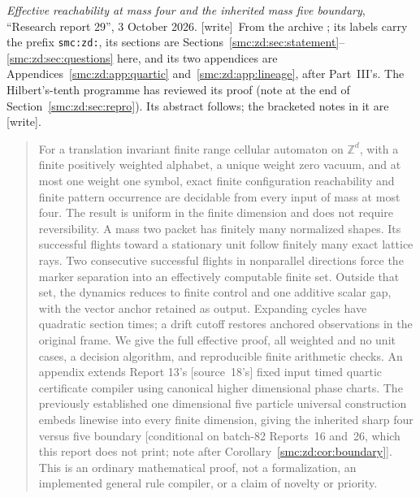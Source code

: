 \documentclass[11pt,letterpaper]{article}
\numberwithin{equation}{section}
\theoremstyle{definition}
\theoremstyle{remark}
\newcommand{\Z}{\mathbb Z}
\newcommand{\wtag}{\textup{[write]}}
\begin{document}
\bigskip
{}
\par
\noindent\emph{Effective reachability at mass four and the inherited mass five boundary}, ``Research report 29'', 3 October 2026. \wtag\ From the archive ; its labels carry the prefix \texttt{smc:zd:}, its sections are Sections~\ref{smc:zd:sec:statement}--\ref{smc:zd:sec:questions} here, and its two appendices are Appendices~\ref{smc:zd:app:quartic} and~\ref{smc:zd:app:lineage}, after Part~III's. The Hilbert's-tenth programme has reviewed its proof (note at the end of Section~\ref{smc:zd:sec:repro}). Its abstract follows; the bracketed notes in it are \wtag.
\begin{quote}\small
For a translation invariant finite range cellular automaton on $\Z^d$, with a finite positively weighted alphabet, a unique weight zero vacuum, and at most one weight one symbol, exact finite configuration reachability and finite pattern occurrence are decidable from every input of mass at most four. The result is uniform in the finite dimension and does not require reversibility. A mass two packet has finitely many normalized shapes. Its successful flights toward a stationary unit follow finitely many exact lattice rays. Two consecutive successful flights in nonparallel directions force the marker separation into an effectively computable finite set. Outside that set, the dynamics reduces to finite control and one additive scalar gap, with the vector anchor retained as output. Expanding cycles have quadratic section times; a drift cutoff restores anchored observations in the original frame. We give the full effective proof, all weighted and no unit cases, a decision algorithm, and reproducible finite arithmetic checks. An appendix extends Report 13's [source~18's] fixed input timed quartic certificate compiler using canonical higher dimensional phase charts. The previously established one dimensional five particle universal construction embeds linewise into every finite dimension, giving the inherited sharp four versus five boundary [conditional on batch-82 Reports~16 and~26, which this report does not print; note after Corollary~\ref{smc:zd:cor:boundary}]. This is an ordinary mathematical proof, not a formalization, an implemented general rule compiler, or a claim of novelty or priority.
\end{quote}
\end{document}
